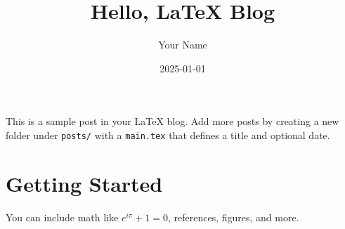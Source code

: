 \documentclass[11pt]{article}
\title{Hello, LaTeX Blog}
\author{Your Name}
\date{2025-01-01}
\begin{document}
\maketitle

This is a sample post in your LaTeX blog. 
Add more posts by creating a new folder under \texttt{posts/} with a \texttt{main.tex} that defines a title and optional date.

\section*{Getting Started}
You can include math like $e^{i\pi}+1=0$, references, figures, and more.
\end{document}
